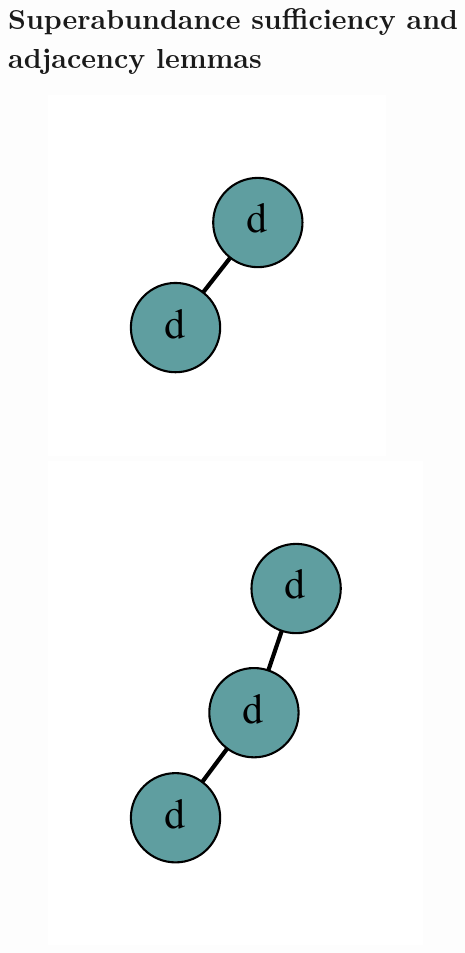 \documentclass[12pt]{article}
\theoremstyle{plain}
\theoremstyle{definition}
\theoremstyle{remark}
\begin{document}
\section{Superabundance sufficiency and adjacency lemmas}
	\begin{figure}[htb]
		\centering
		\includegraphics[scale=0.5]{Superabundance/all/1[1,1].pdf}
		\includegraphics[scale=0.5]{Superabundance/all/011[1,1,2].pdf}

\end{figure}
\end{document}
